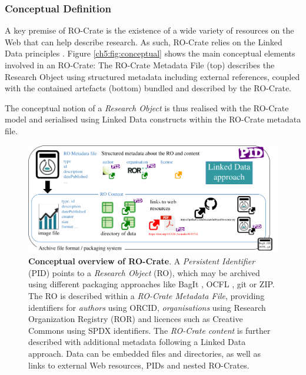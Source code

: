 \subsubsection{Conceptual Definition}\label{ch5:conceptual}

A key premise of RO-Crate is the existence of a wide variety of
resources on the Web that can help describe research. As such, RO-Crate
relies on the Linked Data principles
\cite{ch5-63}.
Figure \vref{ch5:fig:conceptual} shows the main conceptual
elements involved in an RO-Crate: The RO-Crate Metadata File (top)
describes the Research Object using structured metadata including
external references, coupled with the contained artefacts (bottom)
bundled and described by the RO-Crate.

The conceptual notion of a \emph{Research Object}
\cite{Bechhofer 2013}
is thus realised with the RO-Crate model and serialised using Linked
Data constructs within the RO-Crate metadata file.


\begin{figure}%
  \includegraphics[width=\textwidth]{figures/ch05/ro-crate-overview.pdf}
	\caption[Conceptual overview of RO-Crate]{\textbf{Conceptual overview of RO-Crate}. A \emph{Persistent
  Identifier} (PID) \cite{McMurry 2017} points to a
  \emph{Research Object} (RO), which may be archived using different
  packaging approaches like BagIt \cite{ch5-74}, OCFL \cite
  {ch5-96}, git or ZIP. The RO is described within a \emph{RO-Crate
  Metadata File}, providing identifiers for \emph{authors} using ORCID,
  \emph{organisations} using Research Organization Registry (ROR) 
  \cite{ch5-79} and licences such as Creative Commons using SPDX
  identifiers. The \emph{RO-Crate content} is further described with
  additional metadata following a Linked Data approach. Data can be
  embedded files and directories, as well as links to external Web
  resources, PIDs and nested RO-Crates.}
  \label{ch5:fig:conceptual}
\end{figure}

